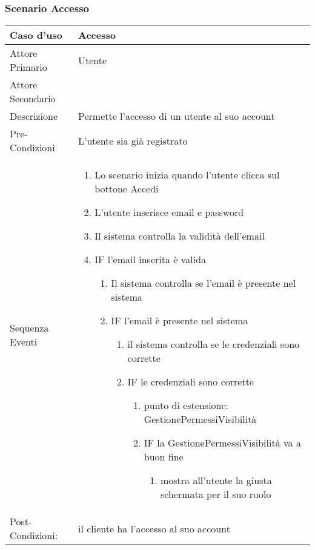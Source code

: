 \subsubsection{Scenario Accesso}
\begin{tabular}{|p{3cm}|p{7cm}|}
\hline 
\rowcolor{Orchid}
Caso d'uso & Accesso \\
\hline
Attore Primario & Utente\\
\hline
Attore Secondario & \\
\hline
Descrizione & Permette l'accesso di un utente al suo account\\
\hline
Pre-Condizioni& L'utente sia già registrato\\
\hline
  Sequenza Eventi&
\begin{enumerate}
\item Lo scenario inizia quando l'utente clicca sul bottone Accedi
\item L'utente inserisce email e password
\item Il sistema controlla la validità dell'email
\item IF l'email inserita è valida
\begin{enumerate}
  \item Il sistema controlla se l'email è presente nel sistema
  \item IF l'email è presente nel sistema
\begin{enumerate}
  \item il sistema controlla se le credenziali sono corrette
\item IF le credenziali sono corrette
\begin{enumerate}
\item punto di estensione: GestionePermessiVisibilità
\item IF la GestionePermessiVisibilità va a buon fine
\begin{enumerate}
  \item mostra all'utente la giusta schermata per il suo ruolo
\end{enumerate}
\end{enumerate}
\end{enumerate}
\end{enumerate}
\end{enumerate}\\
\hline
Post-Condizioni: &il cliente ha l'accesso al suo account \\
  \hline
\end{tabular}\\
